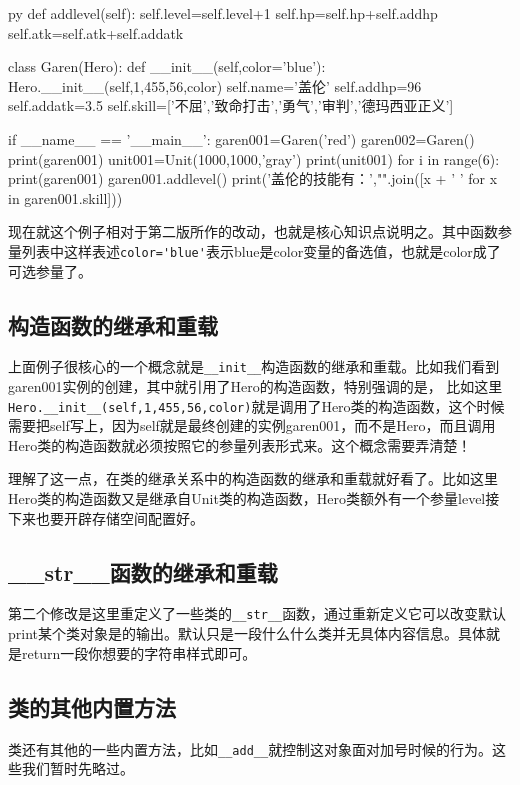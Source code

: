 \documentclass[12pt,oneside]{book}
\begin{document}
\begin{common-format}
\begin{xverbatim}[129]{py}
    def addlevel(self):
        self.level=self.level+1
        self.hp=self.hp+self.addhp
        self.atk=self.atk+self.addatk

class Garen(Hero):
    def __init__(self,color='blue'):
        Hero.__init__(self,1,455,56,color)
        self.name='盖伦'
        self.addhp=96
        self.addatk=3.5
        self.skill=['不屈','致命打击','勇气','审判','德玛西亚正义']

if __name__ == '__main__':
    garen001=Garen('red')
    garen002=Garen()
    print(garen001)
    unit001=Unit(1000,1000,'gray')
    print(unit001)
    for i in range(6):
        print(garen001)
        garen001.addlevel()
    print('盖伦的技能有：',"".join([x + '  ' for x in garen001.skill]))
\end{xverbatim}
现在就这个例子相对于第二版所作的改动，也就是核心知识点说明之。其中函数参量列表中这样表述\verb+color='blue'+表示blue是color变量的备选值，也就是color成了可选参量了。


\subsection{构造函数的继承和重载}
上面例子很核心的一个概念就是\verb+__init__+构造函数的继承和重载。比如我们看到garen001实例的创建，其中就引用了Hero的构造函数，特别强调的是， 比如这里\\
\verb+Hero.__init__(self,1,455,56,color)+就是调用了Hero类的构造函数，这个时候需要把self写上，因为self就是最终创建的实例garen001，而不是Hero，而且调用Hero类的构造函数就必须按照它的参量列表形式来。这个概念需要弄清楚！

理解了这一点，在类的继承关系中的构造函数的继承和重载就好看了。比如这里Hero类的构造函数又是继承自Unit类的构造函数，Hero类额外有一个参量level接下来也要开辟存储空间配置好。

\subsection{\_\_str\_\_{}函数的继承和重载}
第二个修改是这里重定义了一些类的\verb+__str__+函数，通过重新定义它可以改变默认print某个类对象是的输出。默认只是一段什么什么类并无具体内容信息。具体就是return一段你想要的字符串样式即可。




\subsection{类的其他内置方法}
类还有其他的一些内置方法，比如\verb+__add__+就控制这对象面对加号时候的行为。这些我们暂时先略过。


\end{common-format}
\end{document}
